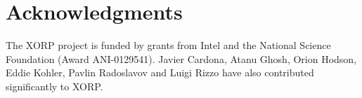 
\section*{Acknowledgments}

The XORP project is funded by grants from Intel and the National
Science Foundation (Award ANI-0129541).  Javier Cardona, Atanu Ghosh,
Orion Hodson, Eddie Kohler, Pavlin Radoslavov and Luigi Rizzo have
also contributed significantly to XORP.

